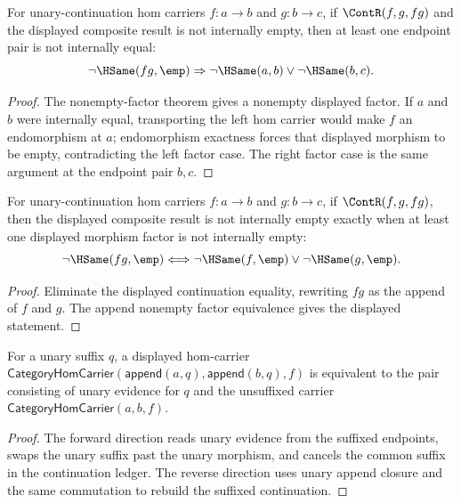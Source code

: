 \begin{theorem}
\label{thm:category-hom-carrier-comp-result-nonempty-endpoint-cases}
For unary-continuation hom carriers $f:a\to b$ and $g:b\to c$, if
$\ContR(f,g,fg)$ and the displayed composite result is not internally empty,
then at least one endpoint pair is not internally equal:
$$
\neg\HSame(fg,\emp)
\Rightarrow
\neg\HSame(a,b)\vee\neg\HSame(b,c).
$$
\end{theorem}
\begin{proof}
The nonempty-factor theorem gives a nonempty displayed factor. If $a$ and $b$
were internally equal, transporting the left hom carrier would make $f$ an
endomorphism at $a$; endomorphism exactness forces that displayed morphism to
be empty, contradicting the left factor case. The right factor case is the
same argument at the endpoint pair $b,c$.
\end{proof}

\begin{theorem}
\label{thm:category-hom-carrier-comp-result-nonempty-iff}
For unary-continuation hom carriers $f:a\to b$ and $g:b\to c$, if
$\ContR(f,g,fg)$, then the displayed composite result is not internally empty
exactly when at least one displayed morphism factor is not internally empty:
$$
\neg\HSame(fg,\emp)
\Longleftrightarrow
\neg\HSame(f,\emp)\vee\neg\HSame(g,\emp).
$$
\end{theorem}
\begin{proof}
Eliminate the displayed continuation equality, rewriting $fg$ as the append of
$f$ and $g$. The append nonempty factor equivalence gives the displayed
statement.
\end{proof}

\begin{theorem}
\label{thm:category-hom-carrier-unary-suffix-iff}
For a unary suffix $q$, a displayed hom-carrier
$\mathsf{CategoryHomCarrier}(\mathsf{append}(a,q),\mathsf{append}(b,q),f)$
is equivalent to the pair consisting of unary evidence for $q$ and the
unsuffixed carrier $\mathsf{CategoryHomCarrier}(a,b,f)$.
\end{theorem}
\begin{proof}
The forward direction reads unary evidence from the suffixed endpoints, swaps
the unary suffix past the unary morphism, and cancels the common suffix in the
continuation ledger. The reverse direction uses unary append closure and the
same commutation to rebuild the suffixed continuation.
\end{proof}

